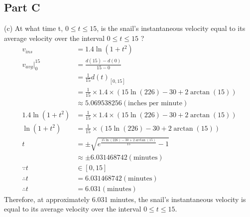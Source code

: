 \documentclass{article}
\begin{document}
\newpage
\subsection{Part C}
(c) At what time t, $0\leq t\leq 15$, is the snail's instantaneous velocity equal to its average velocity over the interval $0\leq t\leq 15$ ?
\begin{align*}
    v_{ins}&=1.4\ln(1+t^2)\\
    v_{avg}\bigg|_0^{15}&=\frac{d(15)-d(0)}{15-0}\\
    &=\frac{1}{15}d(t)_{[0,15]}\\
    &=\frac{1}{15}\times1.4\times (15\ln(226)-30+2\arctan(15))\\
    &\approx 5.069538256 (\text{inches per minute})\\
    1.4\ln(1+t^2) &= \frac{1}{15}\times1.4\times (15\ln(226)-30+2\arctan(15))\\
    \ln(1+t^2) &= \frac{1}{15}\times (15\ln(226)-30+2\arctan(15))\\
    t&=\pm \sqrt{e^{\frac{15\ln(226)-30+2\arctan(15)}{15}}-1}\\
    &\approx\pm 6.031468742 (\text{minutes})\\
    \because t &\in [0,15]\\
    \therefore t &= 6.031468742 (\text{minutes})\\
    \therefore t &= 6.031 (\text{minutes})
\end{align*}
Therefore, at approximately 6.031 minutes, the snail's instantaneous velocity is equal to its average velocity over the interval $0\leq t\leq 15$.



\newpage
\end{document}
